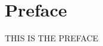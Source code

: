\vspace{0.25em}

\renewcommand{\thefootnote}{\arabic{footnote}}
\setcounter{footnote}{0}

\chapter*{Preface}

THIS IS THE PREFACE